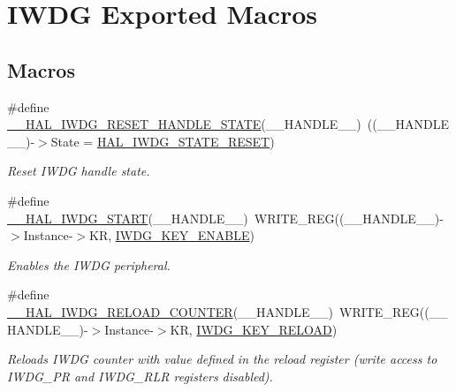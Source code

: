 \hypertarget{group___i_w_d_g___exported___macros}{}\section{I\+W\+DG Exported Macros}
\label{group___i_w_d_g___exported___macros}
\subsection*{Macros}
\begin{DoxyCompactItemize}
\item 
\#define \hyperlink{group___i_w_d_g___exported___macros_ga9990235f5c32f26ed6455a30bc14ee65}{\+\_\+\+\_\+\+H\+A\+L\+\_\+\+I\+W\+D\+G\+\_\+\+R\+E\+S\+E\+T\+\_\+\+H\+A\+N\+D\+L\+E\+\_\+\+S\+T\+A\+TE}(\+\_\+\+\_\+\+H\+A\+N\+D\+L\+E\+\_\+\+\_\+)~((\+\_\+\+\_\+\+H\+A\+N\+D\+L\+E\+\_\+\+\_\+)-\/$>$State = \hyperlink{group___i_w_d_g___exported___types_gga61699dc6f24a3edecddd16018560d0e5afc0696c27fdaa4f7dbe7f08a9b5d6030}{H\+A\+L\+\_\+\+I\+W\+D\+G\+\_\+\+S\+T\+A\+T\+E\+\_\+\+R\+E\+S\+ET})
\begin{DoxyCompactList}\small\item\em Reset I\+W\+DG handle state. \end{DoxyCompactList}\item 
\#define \hyperlink{group___i_w_d_g___exported___macros_ga5914aff5b85e3151bb75377a32d83d6a}{\+\_\+\+\_\+\+H\+A\+L\+\_\+\+I\+W\+D\+G\+\_\+\+S\+T\+A\+RT}(\+\_\+\+\_\+\+H\+A\+N\+D\+L\+E\+\_\+\+\_\+)~W\+R\+I\+T\+E\+\_\+\+R\+EG((\+\_\+\+\_\+\+H\+A\+N\+D\+L\+E\+\_\+\+\_\+)-\/$>$Instance-\/$>$KR, \hyperlink{group___i_w_d_g___registers___bit_mask_ga493295d56bb62752982234755612386f}{I\+W\+D\+G\+\_\+\+K\+E\+Y\+\_\+\+E\+N\+A\+B\+LE})
\begin{DoxyCompactList}\small\item\em Enables the I\+W\+DG peripheral. \end{DoxyCompactList}\item 
\#define \hyperlink{group___i_w_d_g___exported___macros_gac0eaf381e60a654d6b51c43f645e088f}{\+\_\+\+\_\+\+H\+A\+L\+\_\+\+I\+W\+D\+G\+\_\+\+R\+E\+L\+O\+A\+D\+\_\+\+C\+O\+U\+N\+T\+ER}(\+\_\+\+\_\+\+H\+A\+N\+D\+L\+E\+\_\+\+\_\+)~W\+R\+I\+T\+E\+\_\+\+R\+EG((\+\_\+\+\_\+\+H\+A\+N\+D\+L\+E\+\_\+\+\_\+)-\/$>$Instance-\/$>$KR, \hyperlink{group___i_w_d_g___registers___bit_mask_ga33abf7b7c76dfda6b6380448a1d28966}{I\+W\+D\+G\+\_\+\+K\+E\+Y\+\_\+\+R\+E\+L\+O\+AD})
\begin{DoxyCompactList}\small\item\em Reloads I\+W\+DG counter with value defined in the reload register (write access to I\+W\+D\+G\+\_\+\+PR and I\+W\+D\+G\+\_\+\+R\+LR registers disabled). \end{DoxyCompactList}\item 

\end{DoxyCompactItemize}
